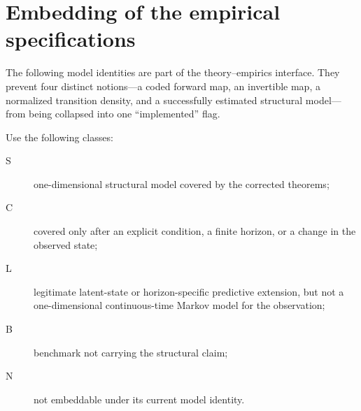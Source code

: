 \documentclass[11pt]{article}
\theoremstyle{remark}
\begin{document}
\section{Embedding of the empirical specifications}

The following model identities are part of the theory--empirics interface.
They prevent four distinct notions---a coded forward map, an invertible map, a
normalized transition density, and a successfully estimated structural
model---from being collapsed into one ``implemented'' flag.

Use the following classes:
\begin{description}
\item[S] one-dimensional structural model covered by the corrected theorems;
\item[C] covered only after an explicit condition, a finite horizon, or a
change in the observed state;
\item[L] legitimate latent-state or horizon-specific predictive extension,
but not a one-dimensional continuous-time Markov model for the observation;
\item[B] benchmark not carrying the structural claim;
\item[N] not embeddable under its current model identity.
\end{description}
\end{document}
